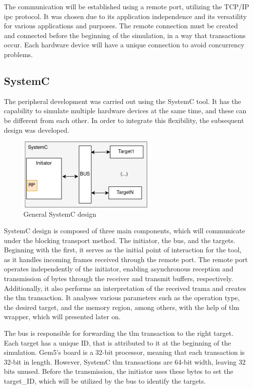 The communication will be established using a remote port, utilizing the TCP/IP \gls{ipc} protocol. It was chosen due to its 
application independence and its versatility for various applications and purposes. The remote connection must be created and connected before 
the beginning of the simulation, in a way that transactions occur. Each hardware device will have a unique connection to avoid concurrency problems.

\subsection{SystemC}

The peripheral development was carried out using the SystemC tool. It has the capability to simulate multiple hardware devices at the same time, 
and these can be different from each other. In order to integrate this flexibility, the subsequent design was developed.

\begin{figure}[H]
	\centering
	\includegraphics[width=0.6\textwidth]{Images/SystemCdesign.png}
	\caption{General SystemC design}
	\label{fig_SystemCdesign_geral}
\end{figure}


SystemC design is composed of three main components, which will communicate under the blocking transport method. 
The initiator, the bus, and the targets.
Beginning with the first, it serves as the initial 
point of interaction for the tool, as it handles incoming frames received through the remote port. The remote port operates independently 
of the initiator, enabling asynchronous reception and transmission of bytes through the receiver and transmit buffers, respectively.
Additionally, it also performs an interpretation of the received trama and creates the \gls{tlm} transaction. It analyses various 
parameters such as the operation type, the desired target, and the memory region, among others, with the help of \gls{tlm} wrapper, 
which will presented later on.

The bus is responsible for forwarding the \gls{tlm} transaction to the right target. Each target has a unique ID, that is attributed to it 
at the beginning of the simulation. Gem5's board is a 32-bit processor, meaning that each transaction is 32-bit in length. However, SystemC 
\gls{tlm} transactions are 64-bit width, leaving 32 bits unused. Before the transmission, the initiator uses these bytes to set the 
target\_ID, which will be utilized by the bus to identify the targets.


